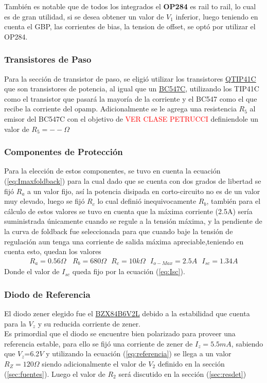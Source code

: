 También es notable que de todos los integrados el \textbf{OP284} es rail to rail, lo cual es de gran utilidad, si se desea obtener un valor de $V_1$ inferior, luego teniendo en cuenta el GBP, las corrientes de bias, la tension de offset, se optó por utilizar el OP284.
\subsubsection{Transistores de Paso}
Para la sección de transistor de paso, se eligió utilizar los transistores \href{https://pdf1.alldatasheet.com/datasheet-pdf/view/532914/FAIRCHILD/TIP31C.html}{QTIP41C} que son transistores de potencia, al igual que un \href{https://pdf1.alldatasheet.com/datasheet-pdf/view/2895/MOTOROLA/BC547C.html}{BC547C}, utilizando los TIP41C como el transistor que pasará la mayoría de la corriente y el BC547 como el que recibe la corriente del opamp.
Adicionalmente se le agrega una resistencia $R_5$ al emisor del BC547C con el objetivo de \textcolor{red}{VER CLASE PETRUCCI} definiendole un valor de $R_5= --\Omega$ 
\subsubsection{Componentes de Protección}

Para la elección de estos componentes, se tuvo en cuenta la ecuación (\ref{eq:Imaxfoldback}) para la cual dado que se cuenta con dos grados de libertad se fijó $R_a$ a un valor fijo, así la potencia disipada en corto-circuito no es de un valor muy elevado, luego se fijó  $R_c$ lo cual definió inequivocamente $R_b$, también para el cálculo de estos valores se tuvo en cuenta que la máxima corriente (2.5A) sería suministrada únicamente cuando se regule a la tensión máxima, y la pendiente de la curva de foldback fue seleccionada para que cuando baje la tensión de regulación aun tenga una corriente de salida máxima apreciable,teniendo en cuenta esto, quedan los valores
\begin{align}
R_a=0.56 \Omega  \ \ \ \ R_b=680\Omega \ \ \ R_c=10k\Omega \ \ \ I_{o-Max}=2.5A \ \ \ I_{sc}= 1.34A
\end{align}
Donde el valor de $I_{sc}$ queda fijo por la ecuación (\ref{eq:Isc}).

\subsubsection{Diodo de Referencia}
El diodo zener elegido fue el \href{https://d1d2qsbl8m0m72.cloudfront.net/en/products/databook/datasheet/discrete/diode/zener/bzx84b6v2lt116-e.pdf}{BZX84B6V2L}
debido a la estabilidad que cuenta para la $V_z$ y su reducida corriente de zener.\\
Es primordial que el diodo se encuentre bien polarizado para proveer una referencia estable, para ello se fijó una corriente de zener de $I_z =5.5mA$, sabiendo que $V_z$=6.2$V$  y utilizando la ecuación (\ref{eq:referencia}) se llega a un valor $R_Z=120\Omega$ siendo adicionalmente el valor de $V_2$ definido en la sección (\ref{sec:fuentes}).
Luego el valor de $R_2$ será discutido en la sección (\ref{sec:resdet})
